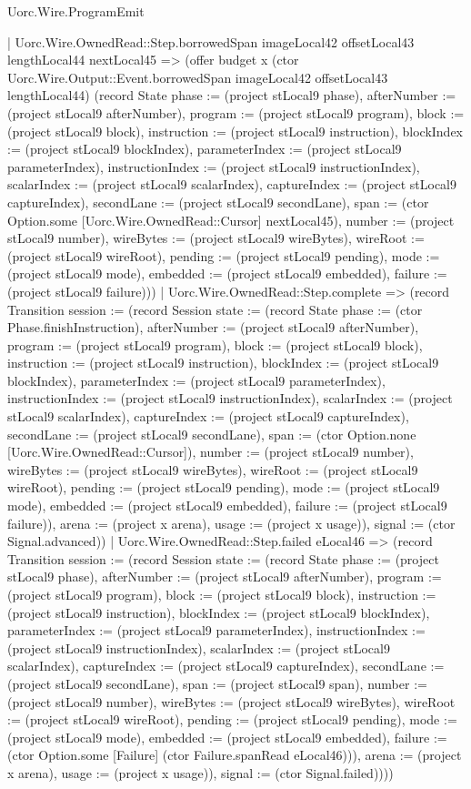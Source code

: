 \begin{lexlean}{Uorc.Wire.ProgramEmit}
\begin{semanticmodule}
{            | Uorc.Wire.OwnedRead::Step.borrowedSpan imageLocal42 offsetLocal43 lengthLocal44 nextLocal45 => (offer budget x (ctor Uorc.Wire.Output::Event.borrowedSpan imageLocal42 offsetLocal43 lengthLocal44) (record State {phase := (project stLocal9 phase), afterNumber := (project stLocal9 afterNumber), program := (project stLocal9 program), block := (project stLocal9 block), instruction := (project stLocal9 instruction), blockIndex := (project stLocal9 blockIndex), parameterIndex := (project stLocal9 parameterIndex), instructionIndex := (project stLocal9 instructionIndex), scalarIndex := (project stLocal9 scalarIndex), captureIndex := (project stLocal9 captureIndex), secondLane := (project stLocal9 secondLane), span := (ctor Option.some [Uorc.Wire.OwnedRead::Cursor] nextLocal45), number := (project stLocal9 number), wireBytes := (project stLocal9 wireBytes), wireRoot := (project stLocal9 wireRoot), pending := (project stLocal9 pending), mode := (project stLocal9 mode), embedded := (project stLocal9 embedded), failure := (project stLocal9 failure)}))
            | Uorc.Wire.OwnedRead::Step.complete => (record Transition {session := (record Session {state := (record State {phase := (ctor Phase.finishInstruction), afterNumber := (project stLocal9 afterNumber), program := (project stLocal9 program), block := (project stLocal9 block), instruction := (project stLocal9 instruction), blockIndex := (project stLocal9 blockIndex), parameterIndex := (project stLocal9 parameterIndex), instructionIndex := (project stLocal9 instructionIndex), scalarIndex := (project stLocal9 scalarIndex), captureIndex := (project stLocal9 captureIndex), secondLane := (project stLocal9 secondLane), span := (ctor Option.none [Uorc.Wire.OwnedRead::Cursor]), number := (project stLocal9 number), wireBytes := (project stLocal9 wireBytes), wireRoot := (project stLocal9 wireRoot), pending := (project stLocal9 pending), mode := (project stLocal9 mode), embedded := (project stLocal9 embedded), failure := (project stLocal9 failure)}), arena := (project x arena), usage := (project x usage)}), signal := (ctor Signal.advanced)})
            | Uorc.Wire.OwnedRead::Step.failed eLocal46 => (record Transition {session := (record Session {state := (record State {phase := (project stLocal9 phase), afterNumber := (project stLocal9 afterNumber), program := (project stLocal9 program), block := (project stLocal9 block), instruction := (project stLocal9 instruction), blockIndex := (project stLocal9 blockIndex), parameterIndex := (project stLocal9 parameterIndex), instructionIndex := (project stLocal9 instructionIndex), scalarIndex := (project stLocal9 scalarIndex), captureIndex := (project stLocal9 captureIndex), secondLane := (project stLocal9 secondLane), span := (project stLocal9 span), number := (project stLocal9 number), wireBytes := (project stLocal9 wireBytes), wireRoot := (project stLocal9 wireRoot), pending := (project stLocal9 pending), mode := (project stLocal9 mode), embedded := (project stLocal9 embedded), failure := (ctor Option.some [Failure] (ctor Failure.spanRead eLocal46))}), arena := (project x arena), usage := (project x usage)}), signal := (ctor Signal.failed)})))
}
\end{semanticmodule}
\end{lexlean}
